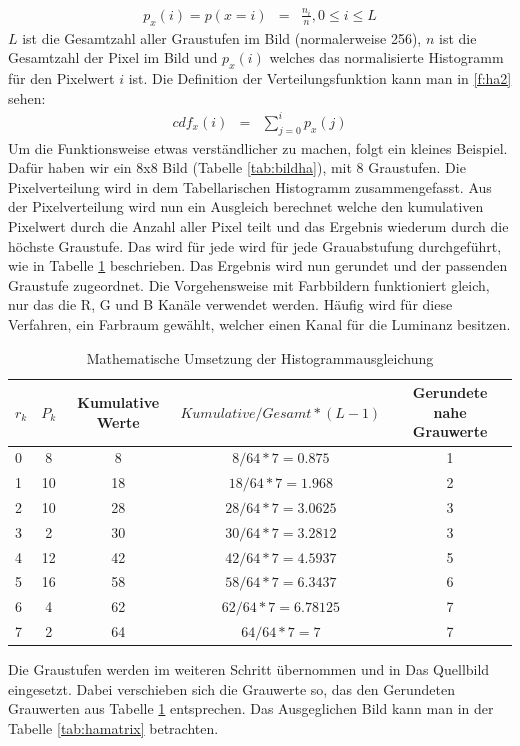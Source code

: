 \begin{eqnarray} \label{f:ha1} p_{x}(i)=p(x=i)&=&\frac{n_{i}}{n}, 0\leq i \leq L \end{eqnarray}
$L$ ist die Gesamtzahl aller Graustufen im Bild (normalerweise 256), $n$ ist die Gesamtzahl der Pixel im Bild und $p_{x}(i)$ welches das normalisierte Histogramm für den Pixelwert $i$ ist. Die Definition der Verteilungsfunktion kann man in \ref{f:ha2} sehen:
\begin{eqnarray} cdf_{x}(i) &=& \sum_{j=0}^i p_{x}(j)\end{eqnarray}
Um die Funktionsweise etwas verständlicher zu machen, folgt ein kleines Beispiel. Dafür haben wir ein 8x8 Bild (Tabelle \ref{tab:bildha}), mit 8 Graustufen. Die Pixelverteilung wird in dem Tabellarischen Histogramm zusammengefasst.  
Aus der Pixelverteilung wird nun ein Ausgleich berechnet welche den kumulativen Pixelwert durch die Anzahl aller Pixel teilt und das Ergebnis wiederum durch die höchste Graustufe. Das wird für jede wird für jede Grauabstufung durchgeführt, wie in Tabelle \ref{tab:haberechnung} beschrieben.
 Das Ergebnis wird nun gerundet und der passenden Graustufe zugeordnet. Die Vorgehensweise mit Farbbildern funktioniert gleich, nur das die R, G und B Kanäle verwendet werden. Häufig wird für diese Verfahren, ein Farbraum gewählt, welcher einen Kanal für die Luminanz besitzen.
  \begin{table}
  [h]
  \caption{Mathematische Umsetzung der Histogrammausgleichung}
  \label{tab:haberechnung}
  \centering
  \begin{tabular}{|l|c|c|c|c|}
  \hline
  $r_{k}$ & $P_{k}$ & Kumulative Werte & $Kumulative/Gesamt*(L-1)$ & Gerundete nahe Grauwerte\\
  \hline
  0 & 8 & 8 & $8/64*7=0.875$ & 1\\
  \hline
  1 & 10 & 18 & $18/64*7=1.968$ & 2\\
  \hline
  2 & 10 & 28 & $28/64*7=3.0625$ & 3\\
  \hline
  3 & 2 & 30 & $30/64*7=3.2812$ & 3\\
  \hline
  4 & 12 & 42 & $42/64*7=4.5937$ & 5\\
  \hline
  5 & 16 & 58 & $58/64*7=6.3437$ & 6\\
  \hline
  6 & 4 & 62 & $62/64*7=6.78125$ & 7\\
  \hline
  7 & 2 & 64 & $64/64*7=7$ & 7\\
  \hline
  \end{tabular}
  \end{table}
Die Graustufen werden im weiteren Schritt übernommen und in Das Quellbild eingesetzt. Dabei verschieben sich die Grauwerte so, das den Gerundeten Grauwerten aus Tabelle \ref{tab:haberechnung} entsprechen. Das Ausgeglichen Bild kann man in der Tabelle \ref{tab:hamatrix} betrachten. 

